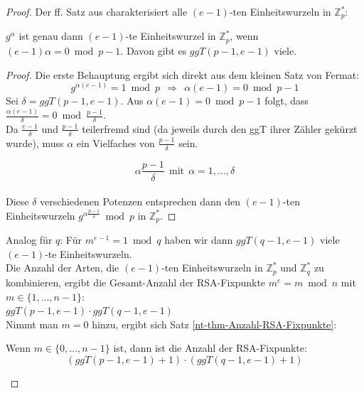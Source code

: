 \begin{refsegment}
\begin{proof}{}
\noindent Der ff. Satz aus \cite[S. 69]{Katzenbeisser2001} charakterisiert alle $(e-1)$-ten Einheitswurzeln in $\mathbb{Z}_p^{*}$:

\begin{satz}\label{nt-katzenbeisser-Anzahl-Einheitswurzeln}
  $g^{\alpha}$ ist genau dann $(e-1)$-te Einheitswurzel in $\mathbb{Z}_p^{*}$,
  wenn $(e-1)\alpha = 0\bmod p-1.$ Davon gibt es $ggT(p-1, e-1)$ viele.
\end{satz}

\begin{proof}{}%
Die erste Behauptung ergibt sich direkt aus dem kleinen Satz von Fermat:
\[g^{\alpha (e-1)}= 1 \bmod p  ~~\Rightarrow~~ \alpha (e-1) = 0\bmod p-1 \]
 Sei $\delta =ggT(p-1, e-1)$. Aus $\alpha (e-1) = 0\bmod p-1$ folgt, dass $\frac{\alpha (e-1)}{\delta}= 0 \bmod \frac{p-1}{\delta}$.\\
Da $\frac {e-1}{\delta}$ und $\frac{p-1}{\delta}$ teilerfremd sind (da jeweils durch
den ggT ihrer Zähler gekürzt wurde), muss $\alpha$ ein Vielfaches von $\frac{p-1}{\delta}$ sein.

\[ \alpha \frac{p-1}{\delta} ~~ \text{mit} ~~ \alpha = 1,...,\delta
\]\\
Diese $\delta$ verschiedenen Potenzen entsprechen dann den
$(e-1)$-ten Einheitswurzeln $g^{\alpha \frac{p-1}{\delta}} \bmod p$ in $\mathbb{Z}_p^{*}$.
\end{proof}


\noindent Analog für $q$: Für $m^{e-1} = 1 \bmod q $ haben wir dann $ ggT(q-1, e-1) $
viele $(e-1)$-te Einheitswurzeln.\\

\noindent Die Anzahl der Arten, die $(e-1)$-ten Einheitswurzeln in $\mathbb{Z}_p^{*}$ und
$\mathbb{Z}_q^{*}$ zu kombinieren, ergibt die Gesamt-Anzahl der RSA-Fixpunkte
$ m^e = m \bmod n$ mit $ m \in \{1,...,n-1\}$:\\
 $ggT(p-1, e-1) \cdot ggT(q-1, e-1) $\\


\noindent Nimmt man $m=0$ hinzu, ergibt sich Satz \ref{nt-thm-Anzahl-RSA-Fixpunkte}:
\begin{satz}\label{nt-thm-Anzahl-RSA-Fixpunkte}
Wenn $ m \in \{0,...,n-1\}$ ist, dann ist die Anzahl der RSA-Fixpunkte:
          \[ (ggT(p-1, e-1)+1) \cdot (ggT(q-1, e-1)+1) \]
\end{satz}


\end{proof}
\end{refsegment}
